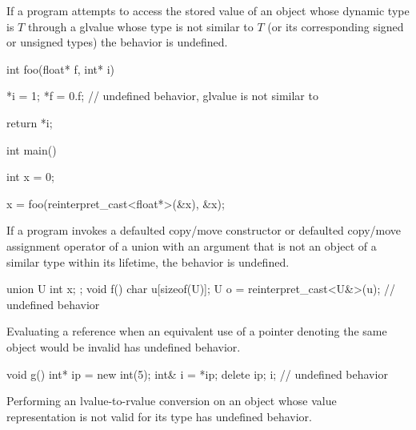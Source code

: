 
\pnum
If a program attempts to access the stored value of an object
whose dynamic type is $T$ through a glvalue
whose type is not similar to $T$
(or its corresponding signed or unsigned types)
the behavior is undefined.

\pnum
\begin{example}
\begin{codeblock}
int foo(float* f, int* i) {
  *i = 1;
  *f = 0.f;     // undefined behavior, glvalue is not similar to 

  return *i;
}

int main() {
  int x = 0;

  x = foo(reinterpret_cast<float*>(&x), &x);
}
\end{codeblock}
\end{example}


\pnum
If a program invokes a defaulted copy/move constructor or
defaulted copy/move assignment operator of a union
with an argument that is not an object of a similar type
within its lifetime, the behavior is undefined.

\pnum
\begin{example}
\begin{codeblock}
union U { int x; };
void f()
{
   char u[sizeof(U)];
   U o = reinterpret_cast<U&>(u);   // undefined behavior
}
\end{codeblock}
\end{example}


\pnum
Evaluating a reference when an equivalent use of a pointer denoting the same object
would be invalid has undefined behavior.

\pnum
\begin{example}
\begin{codeblock}
void g()
{
  int* ip = new int(5);
  int& i = *ip;
  delete ip;
  i;    // undefined behavior
}
\end{codeblock}
\end{example}


\pnum
Performing an
lvalue-to-rvalue conversion
on an object whose
value representation
is not valid for its type
has undefined behavior.

